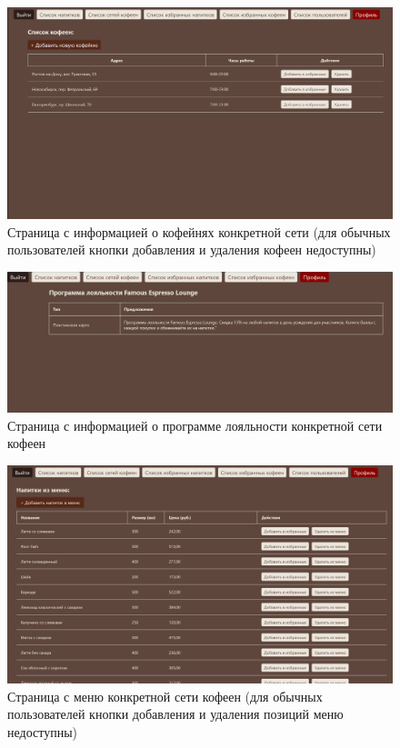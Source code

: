 \begin{figure}[H]
	\centering
	\includegraphics[width=1\linewidth]{img/interface/getcoffeeshops_admin.png}
	\caption{Страница с информацией о кофейнях конкретной сети (для обычных пользователей кнопки добавления и удаления кофеен недоступны)}
	\label{getcoffeeshops}
\end{figure}


\begin{figure}[H]
	\centering
	\includegraphics[width=1\linewidth]{img/interface/getlpbycompany.png}
	\caption{Страница с информацией о программе лояльности конкретной сети кофеен}
	\label{getlpbycompany}
\end{figure}

\begin{figure}[H]
	\centering
	\includegraphics[width=1\linewidth]{img/interface/menu_admin.png}
	\caption{Страница с меню конкретной сети кофеен (для обычных пользователей кнопки добавления и удаления позиций меню недоступны)}
	\label{menu}
\end{figure}

